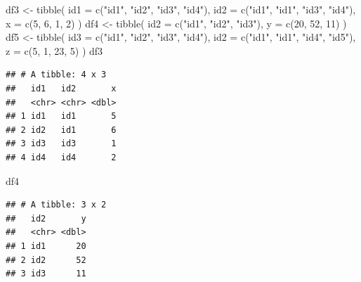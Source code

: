 \documentclass[
]{book}
\newenvironment{Shaded}{\begin{snugshade}}{\end{snugshade}}
\newcommand{\AttributeTok}[1]{\textcolor[rgb]{0.77,0.63,0.00}{#1}}
\newcommand{\DecValTok}[1]{\textcolor[rgb]{0.00,0.00,0.81}{#1}}
\newcommand{\FunctionTok}[1]{\textcolor[rgb]{0.00,0.00,0.00}{#1}}
\newcommand{\NormalTok}[1]{#1}
\newcommand{\OtherTok}[1]{\textcolor[rgb]{0.56,0.35,0.01}{#1}}
\newcommand{\StringTok}[1]{\textcolor[rgb]{0.31,0.60,0.02}{#1}}
\begin{document}
\begin{Shaded}
\begin{Highlighting}[]
\NormalTok{df3 }\OtherTok{\textless{}{-}} \FunctionTok{tibble}\NormalTok{(}
  \AttributeTok{id1 =} \FunctionTok{c}\NormalTok{(}\StringTok{"id1"}\NormalTok{, }\StringTok{"id2"}\NormalTok{, }\StringTok{"id3"}\NormalTok{, }\StringTok{"id4"}\NormalTok{),}
  \AttributeTok{id2 =} \FunctionTok{c}\NormalTok{(}\StringTok{"id1"}\NormalTok{, }\StringTok{"id1"}\NormalTok{, }\StringTok{"id3"}\NormalTok{, }\StringTok{"id4"}\NormalTok{),}
  \AttributeTok{x =} \FunctionTok{c}\NormalTok{(}\DecValTok{5}\NormalTok{, }\DecValTok{6}\NormalTok{, }\DecValTok{1}\NormalTok{, }\DecValTok{2}\NormalTok{)}
\NormalTok{)}
\NormalTok{df4 }\OtherTok{\textless{}{-}} \FunctionTok{tibble}\NormalTok{(}
  \AttributeTok{id2 =} \FunctionTok{c}\NormalTok{(}\StringTok{"id1"}\NormalTok{, }\StringTok{"id2"}\NormalTok{, }\StringTok{"id3"}\NormalTok{),}
  \AttributeTok{y =} \FunctionTok{c}\NormalTok{(}\DecValTok{20}\NormalTok{, }\DecValTok{52}\NormalTok{, }\DecValTok{11}\NormalTok{)}
\NormalTok{)}
\NormalTok{df5 }\OtherTok{\textless{}{-}} \FunctionTok{tibble}\NormalTok{(}
  \AttributeTok{id3 =} \FunctionTok{c}\NormalTok{(}\StringTok{"id1"}\NormalTok{, }\StringTok{"id2"}\NormalTok{, }\StringTok{"id3"}\NormalTok{, }\StringTok{"id4"}\NormalTok{),}
  \AttributeTok{id2 =} \FunctionTok{c}\NormalTok{(}\StringTok{"id1"}\NormalTok{, }\StringTok{"id1"}\NormalTok{, }\StringTok{"id4"}\NormalTok{, }\StringTok{"id5"}\NormalTok{),}
  \AttributeTok{z =} \FunctionTok{c}\NormalTok{(}\DecValTok{5}\NormalTok{, }\DecValTok{1}\NormalTok{, }\DecValTok{23}\NormalTok{, }\DecValTok{5}\NormalTok{)}
\NormalTok{)}
\NormalTok{df3}
\end{Highlighting}
\end{Shaded}

\begin{verbatim}
## # A tibble: 4 x 3
##   id1   id2       x
##   <chr> <chr> <dbl>
## 1 id1   id1       5
## 2 id2   id1       6
## 3 id3   id3       1
## 4 id4   id4       2
\end{verbatim}

\begin{Shaded}
\begin{Highlighting}[]
\NormalTok{df4}
\end{Highlighting}
\end{Shaded}

\begin{verbatim}
## # A tibble: 3 x 2
##   id2       y
##   <chr> <dbl>
## 1 id1      20
## 2 id2      52
## 3 id3      11
\end{verbatim}
\end{document}
